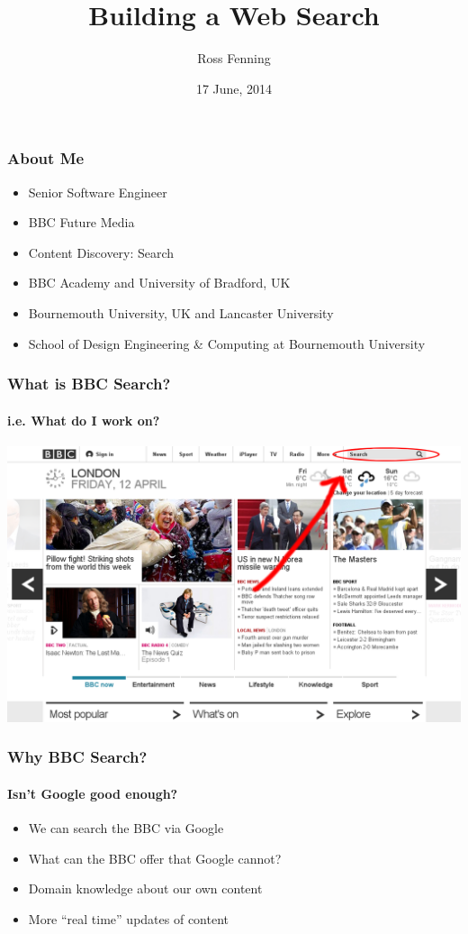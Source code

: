 \documentclass{beamer}
\title{Building a Web Search}
\author{Ross Fenning}
\institute{
  Senior Software Engineer
  \\Content Discovery
  \\Future Media
  \\BBC
}
\date{17 June, 2014}
\begin{document}
\begin{frame}[plain]
  \titlepage
\end{frame}

\begin{frame}
  \frametitle{About Me}
  \begin{itemize}
    \pause \item Senior Software Engineer
    \pause \item BBC Future Media
    \pause \item Content Discovery: Search
    \pause \item BBC Academy and University of Bradford, UK
    \pause \item Bournemouth University, UK and Lancaster University
    \pause \item School of Design Engineering \& Computing at Bournemouth University
  \end{itemize}
\end{frame}

\begin{frame}
  \frametitle{What is BBC Search?}
  \framesubtitle{i.e. What do I work on?}
  \includegraphics[width=\linewidth]{homepage.png}
\end{frame}

\begin{frame}
  \frametitle{Why BBC Search?}
  \framesubtitle{Isn't Google good enough?}
  \begin{itemize}
    \pause \item We can search the BBC via Google
    \pause \item What can the BBC offer that Google cannot?
    \pause \item Domain knowledge about our own content
    \pause \item More ``real time'' updates of content
  \end{itemize}
\end{frame}
\end{document}
